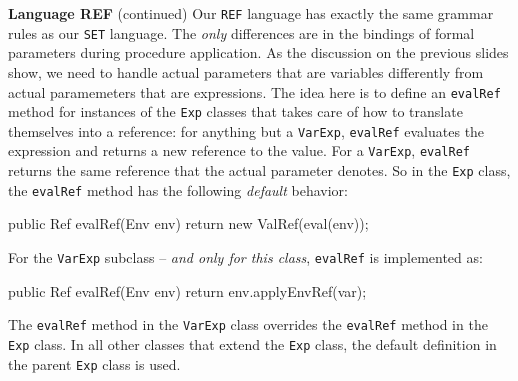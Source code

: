 \begin{minipage}[t]{\sw}
\slidenumber
\LARGE
{\bf Language REF} (continued)\exx
Our \verb'REF' language has exactly the same grammar rules
as our \verb'SET' language.
The {\em only} differences are in the bindings
of formal parameters during procedure application.
As the discussion on the previous slides show,
we need to handle
actual parameters that are variables
differently from
actual paramemeters that are expressions.
The idea here is to define an \verb'evalRef' method
for instances of the \verb'Exp' classes
that takes care of how to translate
themselves into a reference:
for anything but a \verb'VarExp', 
\verb'evalRef' evaluates the expression
and returns a new reference to the value.
For a \verb'VarExp',
\verb'evalRef' returns the same reference
that the actual parameter denotes.\exx
So in the \verb'Exp' class,
the \verb'evalRef' method has the following {\em default} behavior:
{\Large
\begin{qv}
public Ref evalRef(Env env) {
    return new ValRef(eval(env));
}
\end{qv}
}
For the \verb'VarExp' subclass -- {\em and only for this class},
\verb'evalRef' is implemented as:
{\Large
\begin{qv}
public Ref evalRef(Env env) {
    return env.applyEnvRef(var);
}
\end{qv}
}
The \verb'evalRef' method in the \verb'VarExp' class
overrides the \verb'evalRef' method in the \verb'Exp' class.
In all other classes that extend the \verb'Exp' class,
the default definition in the parent \verb'Exp' class is used.
\end{minipage}
\clearpage
